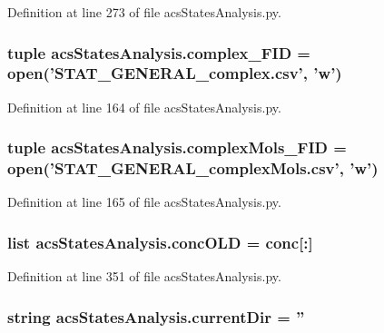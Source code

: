 Definition at line 273 of file acs\-States\-Analysis.\-py.

\hypertarget{a00104_ace41560d233dff88c3073be734bae944}{
\subsubsection[{complex\-\_\-\-F\-I\-D}]{\setlength{\rightskip}{0pt plus 5cm}tuple acs\-States\-Analysis.\-complex\-\_\-\-F\-I\-D = open('S\-T\-A\-T\-\_\-\-G\-E\-N\-E\-R\-A\-L\-\_\-complex.\-csv', 'w')}}\label{a00104_ace41560d233dff88c3073be734bae944}


Definition at line 164 of file acs\-States\-Analysis.\-py.

\hypertarget{a00104_a2ef28958c50aabe7867b32f8dd6f4ace}{
\subsubsection[{complex\-Mols\-\_\-\-F\-I\-D}]{\setlength{\rightskip}{0pt plus 5cm}tuple acs\-States\-Analysis.\-complex\-Mols\-\_\-\-F\-I\-D = open('S\-T\-A\-T\-\_\-\-G\-E\-N\-E\-R\-A\-L\-\_\-complex\-Mols.\-csv', 'w')}}\label{a00104_a2ef28958c50aabe7867b32f8dd6f4ace}


Definition at line 165 of file acs\-States\-Analysis.\-py.

\hypertarget{a00104_a15f99c617a2dc95e52f741ee99e71b7a}{
\subsubsection[{conc\-O\-L\-D}]{\setlength{\rightskip}{0pt plus 5cm}list acs\-States\-Analysis.\-conc\-O\-L\-D = {\bf conc}\mbox{[}\-:\mbox{]}}}\label{a00104_a15f99c617a2dc95e52f741ee99e71b7a}


Definition at line 351 of file acs\-States\-Analysis.\-py.

\hypertarget{a00104_ae98225d5c8c20399f5c3b888fa37746f}{
\subsubsection[{current\-Dir}]{\setlength{\rightskip}{0pt plus 5cm}string acs\-States\-Analysis.\-current\-Dir = ''}}\label{a00104_ae98225d5c8c20399f5c3b888fa37746f}


